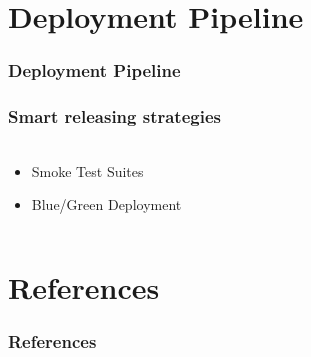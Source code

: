 \documentclass{beamer}
\begin{document}

\section{Deployment Pipeline}

\begin{frame}
	\frametitle{Deployment Pipeline}
	\framesubtitle{}

\end{frame}


\begin{frame}
	\frametitle{Smart releasing strategies}
	\framesubtitle{}
\begin{columns}
 \begin{column}{.49\textwidth}
	\begin{itemize}
		\item Smoke Test Suites
		\item Blue/Green Deployment
	\end{itemize}
\end{column}
\begin{column}{.49\textwidth}
	\begin{figure}
		\begin{center}
		\end{center}
	\end{figure}
\end{column}
\end{columns}

\end{frame}






\section{References}
\begin{frame}
	\frametitle{References}
	\framesubtitle{}

        \nocite{newman,cohn,infosys,clemson,fowler_cont_del,naik}
	
\end{frame}

\end{document}
